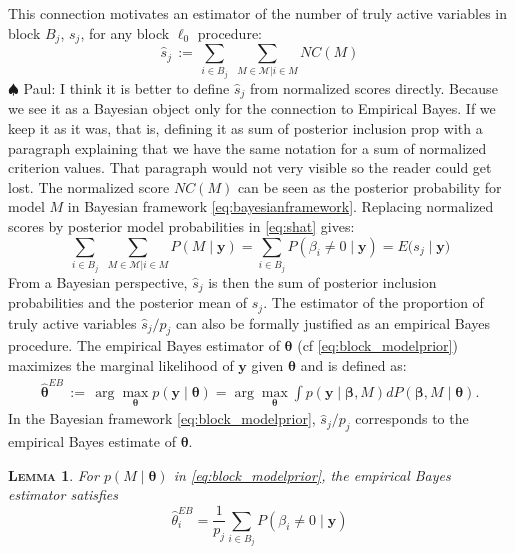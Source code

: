 \documentclass[aos]{imsart}
\theoremstyle{plain}
\newtheorem{lem}{\textsc{Lemma}}[section]
\newcommand{\paul}[1]{{\small{\color{green} \sf $\spadesuit$ Paul: #1}}}
\newcommand{\bs}{\boldsymbol}
\begin{document}
This connection motivates an estimator of the number of truly active variables in block $B_j$, $s_j$, for any block $\ell_0$ procedure:
\begin{equation}\label{eq:shat}
    \widehat{s}_j \,:=\, \sum_{i\in B_j}\,\,\sum_{M\in \mathcal{M} | i \in M}NC(M)
\end{equation}
\paul{I think it is better to define $\widehat{s}_j$ from normalized scores directly. Because we see it as a Bayesian object only for the connection to Empirical Bayes. If we keep it as it was, that is, defining it as sum of posterior inclusion prop with a paragraph explaining that we have the same notation for a sum of normalized criterion values. That paragraph would not very visible so the reader could get lost.}
The normalized score $NC(M)$ can be seen as the posterior probability for model $M$ in Bayesian framework \eqref{eq:bayesianframework}. Replacing normalized scores  by posterior model probabilities in \eqref{eq:shat} gives:
\begin{equation*}
    \sum_{i\in B_j}\,\,\sum_{M\in \mathcal{M} | i \in M}P(M\mid \bs y) = \sum_{i\in B_j}P(\beta_i \neq 0 \mid \bs y) = E\Big(s_j \mid \bs y\Big)
\end{equation*}
From a Bayesian perspective, $\widehat{s}_j$ is then the sum of posterior inclusion probabilities and the posterior mean of $s_j$. The estimator of the proportion of truly active variables $\widehat{s}_j/p_j$ can also be formally justified as an empirical Bayes procedure. The empirical Bayes estimator of $\bs \theta$ (cf \eqref{eq:block_modelprior}) maximizes the marginal likelihood of $\bs y$ given $\bs \theta$ and is defined as:
\begin{align}
\hat{\bs \theta}^{EB}\,:=\, \arg\max_{\bs \theta} p(\bs y \mid \bs \theta)=
\arg\max_{\bs \theta} \int p(\bs y \mid \bs \beta, M) d P(\bs \beta, M \mid \bs \theta).
\nonumber
\end{align}
 In the Bayesian framework \eqref{eq:block_modelprior}, $\widehat{s}_j/p_j$ corresponds to the empirical Bayes estimate of $\bs \theta$.
\begin{lem}\label{lem:empiricalbayesinterpret} For $p(M \mid \bs \theta)$ in \eqref{eq:block_modelprior}, the empirical Bayes estimator satisfies $$\hat{\theta}^{EB}_i = \frac{1}{p_j}\sum_{i\in B_j}P(\beta_i \neq 0 \mid \bs y)$$
\end{lem}
\end{document}
